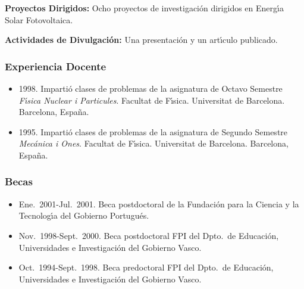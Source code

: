 \documentclass{article}
\begin{document}
\medskip
{\bf Proyectos Dirigidos:}
%
Ocho proyectos de investigaci\'on dirigidos en Energ\'{\i}a Solar Fotovoltaica.


\medskip
{\bf Actividades de Divulgaci\'on:}
%
Una presentaci\'on y un art\'{\i}culo publicado.


\subsubsection*{Experiencia Docente}

\begin{itemize}\itemsep 0pt
\item 1998.
Imparti\'{o} clases de problemas de la asignatura de Octavo Semestre 
{\it F\'{\i}sica Nuclear i Parti\-cu\-les}. 
Facultat de F\'{\i}sica. 
Universitat de Barcelona. 
Barcelona, Espa\~na.

\item 1995.
Imparti\'{o} clases de problemas de la asignatura de Segundo Semestre 
{\it Mec\'{a}nica i Ones}. 
Facultat de F\'{\i}sica. 
Universitat de Barcelona. 
Barcelona, Espa\~na.
\end{itemize}


\subsubsection*{Becas}

\begin{itemize}\itemsep 0pt
\item Ene.~2001-Jul.~2001.
Beca postdoctoral de la Fundaci\'on para la Ciencia y la 
Tecnolog\'{\i}a del Gobierno Portugu\'es.

\item Nov.~1998-Sept.~2000. 
Beca postdoctoral FPI del Dpto.\ de Educaci\'{o}n, Universidades 
e Investigaci\'{o}n del Gobierno Vasco. 

\item Oct.~1994-Sept.~1998. 
Beca predoctoral FPI del Dpto.\ de Educaci\'{o}n, Universidades 
e Investigaci\'{o}n
\linebreak
del Gobierno Vasco.
\end{itemize}
\end{document}
